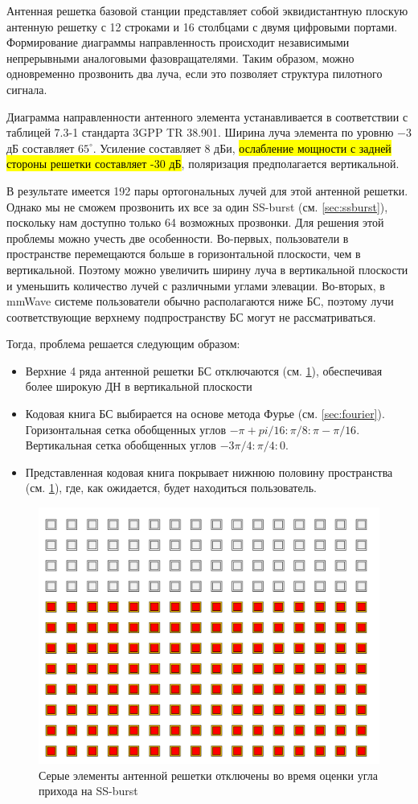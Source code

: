 Антенная решетка базовой станции представляет собой эквидистантную плоскую
антенную решетку с 12 строками и 16 столбцами с двумя цифровыми портами.
Формирование диаграммы направленность происходит независимыми непрерывными
аналоговыми фазовращателями. Таким образом, можно одновременно прозвонить два
луча, если это позволяет структура пилотного сигнала.

Диаграмма направленности антенного элемента устанавливается в соответствии с
таблицей 7.3-1 стандарта 3GPP TR 38.901. Ширина луча элемента по уровню $-3$ дБ
составляет $65^\circ$. Усиление составляет 8 дБи, \hl{ослабление мощности с задней
стороны решетки составляет -30 дБ}, поляризация предполагается вертикальной.

В результате имеется 192 пары ортогональных лучей для этой антенной решетки.
Однако мы не сможем прозвонить их все за один SS-burst (см. \ref{sec:ssburst}),
поскольку нам доступно только 64 возможных прозвонки. Для решения этой проблемы
можно учесть две особенности.  Во-первых, пользователи в пространстве перемещаются больше в
горизонтальной плоскости, чем в вертикальной. Поэтому можно увеличить ширину
луча в вертикальной плоскости и уменьшить количество лучей с различными углами
элевации.  Во-вторых, в mmWave системе пользователи обычно располагаются ниже
БС, поэтому лучи соответствующие верхнему подпространству БС могут не
рассматриваться.

Тогда, проблема решается следующим образом:
\begin{itemize}
    \item Верхние 4 ряда антенной решетки БС отключаются (см. \ref{fig:4.6}), обеспечивая более широкую ДН в вертикальной плоскости
    \item Кодовая книга БС выбирается на основе метода Фурье (см.
    \ref{sec:fourier}). Горизонтальная сетка обобщенных углов $-\pi +
    pi/16:\pi/8:\pi-\pi/16$.
          Вертикальная сетка обобщенных углов $-3\pi/4:\pi/4:0$.
    \item Представленная кодовая книга покрывает нижнюю половину пространства (см. \ref{fig:4.6}), где, как ожидается, будет находиться пользователь.
\end{itemize}

\begin{figure}[ht]
    \centering
    \includegraphics[width=0.35\linewidth]{figs/fig4.5.png}
    \caption{Серые элементы антенной решетки отключены во время оценки угла прихода на SS-burst}
    \label{fig:4.6}
\end{figure}

